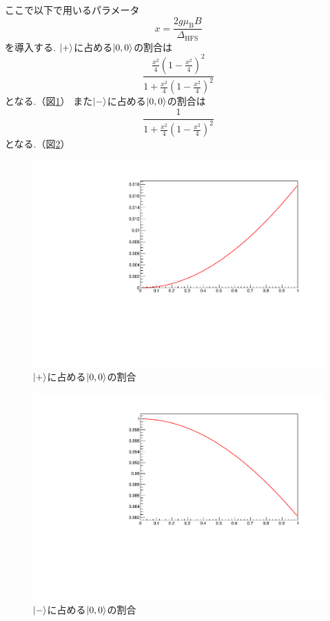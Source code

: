 ここで以下で用いるパラメータ
\begin{equation}
	\nonumber
	x = \frac{2g\mu_{\mathrm{B}}B}{\Delta_{\mathrm{HFS}}}
\end{equation}
を導入する.
$\ket{+}$に占める$\ket{0,0}$の割合は
\begin{equation}
	\nonumber
\frac{ \frac{x^{2}}{4} \left(1-\frac{x^{2}}{4}\right)^{2}  }{  1+\frac{x^{2}}{4}\left( 1-\frac{x^{2}}{4} \right)^2   }
\end{equation}
となる.（図\ref{fig:plusstate}）
また$\ket{-}$に占める$\ket{0,0}$の割合は
\begin{equation}
	\nonumber
\frac{1}{1+\frac{x^{2}}{4}\left(1-\frac{x^{2}}{4}\right)^{2}}
\end{equation}
となる.（図\ref{fig:minusstate}）

\begin{figure}[H]
\centering
\includegraphics[keepaspectratio,angle=270,scale=0.6]{fig/ybm/plusstate.pdf}
\caption{$\ket{+}$に占める$\ket{0,0}$の割合}
\label{fig:plusstate}
\end{figure}

\begin{figure}[H]
\centering
\includegraphics[keepaspectratio,angle=270,scale=0.6]{fig/ybm/minusstate.pdf}
\caption{$\ket{-}$に占める$\ket{0,0}$の割合}
\label{fig:minusstate}
\end{figure}

